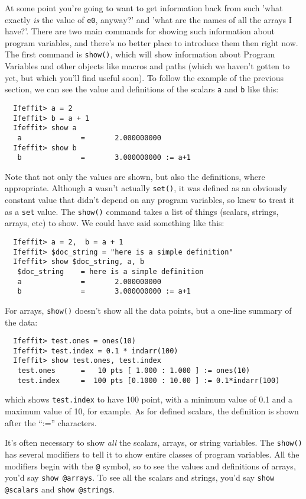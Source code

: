 \documentclass[11pt]{article}
\begin{document}
At some point you're going to want to get information back from {\ifeffit}
such 'what exactly {\emph{is}} the value of {\tt{e0}}, anyway?' and 'what
are the names of all the arrays I have?'.  There are two main commands for
showing such information about program variables, and there's no better
place to introduce them then right now.  The first command is
{\tt{show()}}, which will show information about Program Variables and
other {\ifeffit} objects like macros and paths (which we haven't gotten to
yet, but which you'll find useful soon).  To follow the example of the
previous section, we can see the value and definitions of the scalars
{\tt{a}} and {\tt{b}} like this:
{\small\begin{verbatim}
  Ifeffit> a = 2
  Ifeffit> b = a + 1
  Ifeffit> show a
   a              =       2.000000000
  Ifeffit> show b
   b              =       3.000000000 := a+1
\end{verbatim}
}\noindent
Note that not only the values are shown, but also the definitions, where
appropriate.  Although {\tt{a}} wasn't actually {\tt{set()}}, it was
defined as an obviously constant value that didn't depend on any program
variables, so {\feffit} knew to treat it as a {\tt{set}} value.  The
{\tt{show()}} command takes a list of things (scalars, strings, arrays,
etc) to show.  We could have said something like this:
{\small\begin{verbatim}
  Ifeffit> a = 2,  b = a + 1
  Ifeffit> $doc_string = "here is a simple definition"
  Ifeffit> show $doc_string, a, b
   $doc_string    = here is a simple definition
   a              =       2.000000000
   b              =       3.000000000 := a+1
\end{verbatim}
}\noindent   %
For arrays, {\tt{show()}} doesn't show all the data points, but a one-line
summary of the data:
{\small\begin{verbatim}
  Ifeffit> test.ones = ones(10)
  Ifeffit> test.index = 0.1 * indarr(100)
  Ifeffit> show test.ones, test.index
   test.ones      =   10 pts [ 1.000 : 1.000 ] := ones(10)
   test.index     =  100 pts [0.1000 : 10.00 ] := 0.1*indarr(100)
\end{verbatim}
}\noindent
which shows {\tt{test.index}} to have 100 point, with a minimum value of
0.1 and a maximum value of 10, for example.  As for defined scalars, the
definition is shown after the ``:='' characters.

It's often necessary to show {\emph{all}} the scalars, arrays, or string
variables.  The {\tt{show()}} has several modifiers to tell it to show
entire classes of program variables.  All the modifiers begin with the
{\tt{@}} symbol, so to see the values and definitions of arrays, you'd say
{\tt{show @arrays}}.  To see all the scalars and strings, you'd say
{\tt{show @scalars}} and {\tt{show @strings}}.
\end{document}
